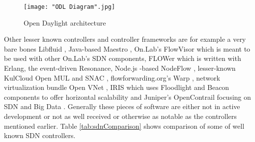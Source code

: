 \begin{figure}[h!t]
\centering
{}
\texttt{[image: "ODL Diagram".jpg]}
\caption{Open Daylight architecture}
\label{fig:ODL}
\end{figure}

Other lesser known controllers and controller frameworks are for example a very bare bones Libfluid \cite{Libfluid}, Java-based Maestro \cite{Maestro}, On.Lab’s FlowVisor \cite{FlowVisor} which is meant to be used with other On.Lab’s SDN components, FLOWer \cite{Flower} which is written with Erlang, the event-driven Resonance\cite{Resonance}, Node.js -based NodeFlow \cite{Nodeflow}, lesser-known KulCloud Open MUL and SNAC \cite{MUL, SNAC}, flowforwarding.org’s Warp \cite{Warp}, network virtualization bundle Open VNet \cite{VNet}, IRIS which uses Floodlight and Beacon components to offer horizontal scalability \cite{IRIS} and Juniper’s OpenContrail focusing on SDN and Big Data \cite{Contrail}. Generally these pieces of software are either not in active development or not as well received or otherwise as notable as the controllers mentioned earlier. Table \ref{tab:sdnComparison} shows comparison of some of well known SDN controllers.  

